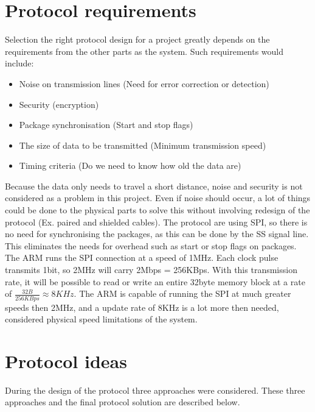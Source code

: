 
\section{Protocol requirements}
Selection the right protocol design for a project greatly depends on the requirements from the other parts as the system. Such requirements would include: 
\begin{itemize}
\item Noise on transmission lines (Need for error correction or detection)
\item Security (encryption)
\item Package synchronisation (Start and stop flags)
\item The size of data to be transmitted (Minimum transmission speed)
\item Timing criteria (Do we need to know how old the data are)
\end{itemize}

Because the data only needs to travel a short distance, noise and security is not considered as a problem in this project. Even if noise should occur, a lot of things could be done to the physical parts to solve this without involving redesign of the protocol (Ex. paired and shielded cables). 
The protocol are using SPI, so there is no need for synchronising the packages, as this can be done by the SS signal line. This eliminates the needs for overhead such as start or stop flags on packages. 
The ARM runs the SPI connection at a speed of 1MHz. Each clock pulse transmits 1bit, so 2MHz will carry 2Mbps = 256KBps. With this transmission rate, it will be possible to read or write an entire 32byte memory block at a rate of $\frac{32B}{256KBps} \approx 8KHz$. The ARM is capable of running the SPI at much greater speeds then 2MHz, and a update rate of 8KHz is a lot more then needed, considered physical speed limitations of the  system.


\section{Protocol ideas}
\label{spi_protocol_ideas}
During the design of the protocol three approaches were considered. These three approaches and the final protocol solution are described below.


